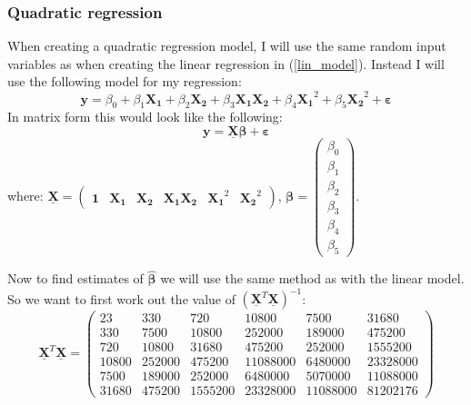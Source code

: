 \documentclass[12pt]{article}
\newcommand{\vect}[1]{\boldsymbol{#1}}
\newcommand{\mat}[1]{\underline{\boldsymbol{#1}}}
\newcommand{\trans}[1]{#1^T}
\newcommand{\est}[1]{\hat{#1}}
\begin{document}
\subsubsection{Quadratic regression}
When creating a quadratic regression model, I will use the same random input variables as when creating the linear regression in (\ref{lin_model}). Instead I will use the following model for my regression:
\begin{equation} \label{quad_model}
  \vect{y} = \beta_0 + \beta_1\vect{X_1} + \beta_2\vect{X_2} + \beta_3\vect{X_1}\vect{X_2} + \beta_4\vect{X_1}^2 + \beta_5\vect{X_2}^2 + \vect{\varepsilon}
\end{equation}
In matrix form this would look like the following:
\begin{equation*}
  \vect{y} = \mat{X}\vect{\beta} + \vect{\varepsilon}
\end{equation*}
where:
$\mat{X} = \begin{pmatrix}
              \vect{1} & \vect{X_1} & \vect{X_2} & \vect{X_1}\vect{X_2} & \vect{X_1}^2 & \vect{X_2}^2
           \end{pmatrix}$,
$\vect{\beta} = \begin{pmatrix}
                  \beta_0 \\ \beta_1 \\ \beta_2 \\ \beta_3 \\ \beta_4 \\ \beta_5
                \end{pmatrix}$. \par
Now to find estimates of $\est{\vect{\beta}}$ we will use the same method as with the linear model. So we want to first work out the value of $(\trans{\mat{X}}\mat{X})^{-1}$:
\begin{equation*}
  \trans{\mat{X}}\mat{X} =
  \begin{pmatrix}
    23       &   330        &   720       &     10800      &   7500      &   31680    \\
    330      &   7500       &   10800     &     252000     &   189000    &   475200   \\
    720      &   10800      &   31680     &     475200     &   252000    &   1555200  \\
    10800    &   252000     &   475200    &   11088000     &   6480000   &   23328000 \\
    7500     &   189000     &   252000    &     6480000    &   5070000   &   11088000 \\
    31680    &   475200     &   1555200   &     23328000   &   11088000  &   81202176
  \end{pmatrix}
\end{equation*}
\end{document}
